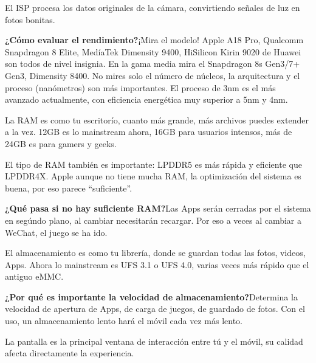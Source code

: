 
El ISP procesa los datos originales de la cámara, convirtiendo señales de luz en fotos bonitas.

\textbf{¿Cómo evaluar el rendimiento?}¡Mira el modelo! Apple A18 Pro, Qualcomm Snapdragon 8 Elite, MedíaTek Dimensity 9400, HiSilicon Kirin 9020 de Huawei son todos de nivel insignia. En la gama media mira el Snapdragon 8s Gen3/7+ Gen3, Dimensity 8400. No mires solo el número de núcleos, la arquitectura y el proceso (nanómetros) son más importantes. El proceso de 3nm es el más avanzado actualmente, con eficiencia energética muy superior a 5nm y 4nm.


La RAM es como tu escritorío, cuanto más grande, más archivos puedes extender a la vez. 12GB es lo mainstream ahora, 16GB para usuarios intensos, más de 24GB es para gamers y geeks.

El tipo de RAM también es importante: LPDDR5 es más rápida y eficiente que LPDDR4X. Apple aunque no tiene mucha RAM, la optimización del sistema es buena, por eso parece “suficiente”.

\textbf{¿Qué pasa si no hay suficiente RAM?}Las Apps serán cerradas por el sistema en segúndo plano, al cambiar necesitarán recargar. Por eso a veces al cambiar a WeChat, el juego se ha ido.


El almacenamiento es como tu librería, donde se guardan todas las fotos, videos, Apps. Ahora lo mainstream es UFS 3.1 o UFS 4.0, varias veces más rápido que el antiguo eMMC.

\textbf{¿Por qué es importante la velocidad de almacenamiento?}Determina la velocidad de apertura de Apps, de carga de juegos, de guardado de fotos. Con el uso, un almacenamiento lento hará el móvil cada vez más lento.


La pantalla es la principal ventana de interacción entre tú y el móvil, su calidad afecta directamente la experiencia.

